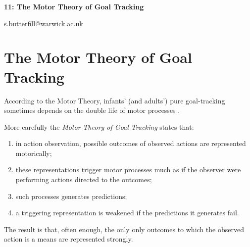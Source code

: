 \documentclass[12pt]{extarticle}
\date{}
\makeatletter
\def \ititle {Philosophical Psychology}
\def \iemail{s.butterfill@warwick.ac.uk}
\makeatother
\begin{document}
\begin{multicols*}{3}

\setlength\footnotesep{1em}










\def \ititle {11: The Motor Theory of Goal Tracking}

\begin{center}

{\Large

\textbf{\ititle}

}



\iemail %

\end{center}

 
 
\section{The Motor Theory of Goal Tracking}
 

According to the  Motor Theory, infants’ (and adults’) pure goal-tracking sometimes depends on the double life of motor processes  \citep[see][for details]{sinigaglia:2015_puzzle}.
 
More carefully the \emph{Motor Theory of Goal Tracking} states that:
\begin{enumerate}
\item in action observation, possible outcomes of observed actions are represented motorically;
\item these representations trigger motor processes much as if the observer were performing actions directed to the outcomes;
\item such processes generates predictions;
\item a triggering representation is weakened if the predictions it generates fail.
\end{enumerate}
The result is that, often enough, the only only outcomes to which the observed action is a means
are represented strongly.
 
 

\vfill



\footnotesize


\end{multicols*}
\end{document}
